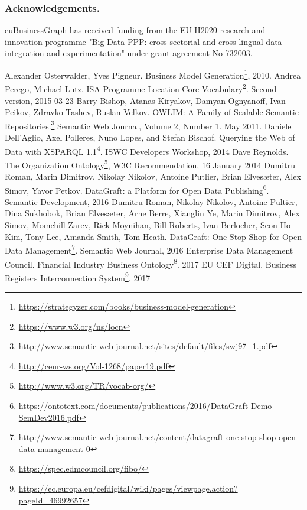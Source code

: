 \documentclass[runningheads,a4paper]{llncs}
\begin{document}
\subsubsection*{Acknowledgements.}euBusinessGraph has received funding from the EU H2020 research and innovation programme "Big Data PPP: cross-sectorial and cross-lingual data integration and experimentation" under grant agreement No 732003.


\begin{thebibliography}{4}

 Alexander Osterwalder, Yves Pigneur. Business Model Generation\footnote{\url{https://strategyzer.com/books/business-model-generation}}, 2010.
 Andrea Perego, Michael Lutz. ISA Programme Location Core Vocabulary\footnote{\url{https://www.w3.org/ns/locn}}. Second version, 2015-03-23
 Barry Bishop, Atanas Kiryakov, Damyan Ognyanoff, Ivan Peikov, Zdravko Tashev, Ruslan Velkov. OWLIM: A Family of Scalable Semantic Repositories.\footnote{\url{http://www.semantic-web-journal.net/sites/default/files/swj97_1.pdf}} Semantic Web Journal, Volume 2, Number 1. May 2011.
 Daniele Dell'Aglio, Axel Polleres, Nuno Lopes, and Stefan Bischof. Querying the Web of Data with XSPARQL 1.1\footnote{\url{http://ceur-ws.org/Vol-1268/paper19.pdf}}. ISWC Developers Workshop, 2014
 Dave Reynolds. The Organization Ontology\footnote{\url{http://www.w3.org/TR/vocab-org/}}, W3C Recommendation, 16 January 2014
 Dumitru Roman, Marin Dimitrov, Nikolay Nikolov, Antoine Putlier, Brian Elvesæter, Alex Simov, Yavor Petkov. DataGraft: a Platform for Open Data Publishing\footnote{\url{https://ontotext.com/documents/publications/2016/DataGraft-Demo-SemDev2016.pdf}}. Semantic Development, 2016
 Dumitru Roman, Nikolay Nikolov, Antoine Pultier, Dina Sukhobok, Brian Elvesæter, Arne Berre, Xianglin Ye, Marin Dimitrov, Alex Simov, Momchill Zarev, Rick Moynihan, Bill Roberts, Ivan Berlocher, Seon-Ho Kim, Tony Lee, Amanda Smith, Tom Heath. DataGraft: One-Stop-Shop for Open Data Management\footnote{\url{http://www.semantic-web-journal.net/content/datagraft-one-stop-shop-open-data-management-0}}. Semantic Web Journal, 2016
 Enterprise Data Management Council. Financial Industry Business Ontology\footnote{\url{https://spec.edmcouncil.org/fibo/}}. 2017
 EU CEF Digital. Business Registers Interconnection System\footnote{\url{https://ec.europa.eu/cefdigital/wiki/pages/viewpage.action?pageId=46992657}}. 2017

\end{thebibliography}
\end{document}
